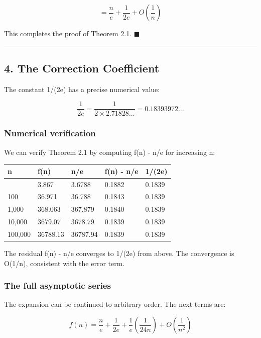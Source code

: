 \documentclass[
]{article}
\newcounter{none} %
\begin{document}
\[= \frac{n}{e} + \frac{1}{2e} + O\!\left(\frac{1}{n}\right)\]

This completes the proof of Theorem 2.1. \(\blacksquare\)

\begin{center}\rule{0.5\linewidth}{0.5pt}\end{center}

\subsection{4. The Correction
Coefficient}\label{the-correction-coefficient}

The constant 1/(2e) has a precise numerical value:

\[\frac{1}{2e} = \frac{1}{2 \times 2.71828\ldots} = 0.18393972\ldots\]

\subsubsection{Numerical verification}\label{numerical-verification}

We can verify Theorem 2.1 by computing f(n) - n/e for increasing n:

{\def\LTcaptype{none} %
\begin{longtable}[]{@{}lllll@{}}
\toprule\noalign{}
n & f(n) & n/e & f(n) - n/e & 1/(2e) \\
\midrule\noalign{}
\endhead
\bottomrule\noalign{}
\endlastfoot
10 & 3.867 & 3.6788 & 0.1882 & 0.1839 \\
100 & 36.971 & 36.788 & 0.1843 & 0.1839 \\
1,000 & 368.063 & 367.879 & 0.1840 & 0.1839 \\
10,000 & 3679.07 & 3678.79 & 0.1839 & 0.1839 \\
100,000 & 36788.13 & 36787.94 & 0.1839 & 0.1839 \\
\end{longtable}
}

The residual f(n) - n/e converges to 1/(2e) from above. The convergence
is O(1/n), consistent with the error term.

\subsubsection{The full asymptotic
series}\label{the-full-asymptotic-series}

The expansion can be continued to arbitrary order. The next terms are:

\[f(n) = \frac{n}{e} + \frac{1}{2e} + \frac{1}{e}\left(\frac{1}{24n}\right) + O\!\left(\frac{1}{n^2}\right)\]
\end{document}
